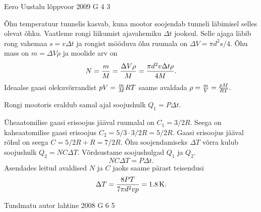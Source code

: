 \documentclass[11pt, twoside]{article}
\begin{document}
{%
{Eero Uustalu} %
{lõppvoor} %
{2009} %
{G 4} %
{3} %
{

\ifSolution
Õhu temperatuur tunnelis kasvab, kuna mootor soojendab tunneli läbimisel selles olevat õhku. Vaatleme rongi liikumist ajavahemiku $\Delta t$ jooksul. Selle ajaga läbib rong vahemaa $s = v \Delta t$ ja rongist mööduva õhu ruumala on $\Delta V = \pi d^2 s /4$. Õhu mass on $m = \Delta V \rho$ ja moolide arv on
\[
N = {m \over M}={\Delta V \rho \over M}={\pi d^2 v \Delta t\rho\over 4M}.
\]
Ideaalse gaasi olekuvõrrandist $pV={m\over M}RT$ saame avaldada $\rho={m\over V}={pM\over RT}.$

Rongi mootoris eraldub samal ajal soojushulk $Q_1 = P \Delta t$.

Üheaatomilise gaasi erisoojus jääval ruumalal on $C_1 = 3/2 R$. Seega on kaheaatomilise gaasi erisoojus $C_2 = 5/3 \cdot 3/2R = 5/2 R$. Gaasi erisoojus jääval rõhul on seega $C = 5/2R + R = 7/2 R$. Õhu soojendamiseks $\Delta T$ võrra kulub soojushulk $Q_2 = N C \Delta T$. Võrdsustame soojushulgad $Q_1$ ja $Q_2$.
\[
N C \Delta T = P \Delta t.
\]
Asendades leitud avaldised $N$ ja $C$ jaoks saame pärast teisendusi
\[
\Delta T = {8 P T \over 7\pi d^2 v p } = \SI{1.8}{K}.
\]
\fi
}

{Tundmatu autor} %
{lahtine} %
{2008} %
{G 6} %
{5} %
{

}}
\end{document}
